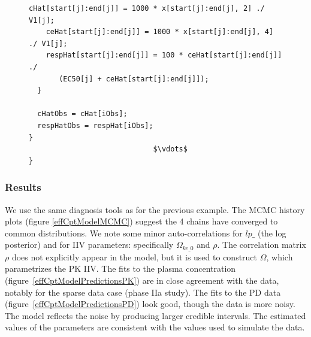 \documentclass[11pt]{amsart}
\newenvironment{fmpage}[1]
     {\begin{lrbox}{\fmbox}\begin{minipage}{#1}}
     {\end{minipage}\end{lrbox}\fbox{\usebox{\fmbox}}}
\begin{document}
\begin{figure}
\begin{small}
\begin{center}
\begin{fmpage}{\textwidth - .75in}
\begin{lstlisting}[basicstyle=\tiny\ttfamily,mathescape=true,flexiblecolumns=true,frame=single,escapeinside=`']
    cHat[start[j]:end[j]] = 1000 * x[start[j]:end[j], 2] ./ V1[j];
    ceHat[start[j]:end[j]] = 1000 * x[start[j]:end[j], 4] ./ V1[j];
    respHat[start[j]:end[j]] = 100 * ceHat[start[j]:end[j]] ./ 
       (EC50[j] + ceHat[start[j]:end[j]]);
  }

  cHatObs = cHat[iObs];
  respHatObs = respHat[iObs];
}
                             $\vdots$  
} 
\end{lstlisting}
\end{fmpage}
\end{center}
\end{small}
\label{effCptModelCode}
\end{figure}

\subsubsection*{Results} We use the same diagnosis tools as for the previous example. The MCMC history plots (figure \ref{effCptModelMCMC}) suggest the 4 chains have converged to common distributions. We note some minor auto-correlations for $lp\_$ (the log posterior) and for IIV parameters: specifically $\Omega_{ke\_0}$ and $\rho$. The correlation matrix $\rho$ does not explicitly appear in the model, but it is used to construct $\Omega$, which parametrizes the PK IIV. The fits to the plasma concentration  (figure~\ref{effCptModelPredictionsPK}) are in close agreement with the data, notably for the sparse data case (phase IIa study). The fits to the PD data (figure~\ref{effCptModelPredictionsPD}) look good, though the data is more noisy. The model reflects the noise by producing larger credible intervals. The estimated values of the parameters are consistent with the values used to simulate the data.
\end{document}
